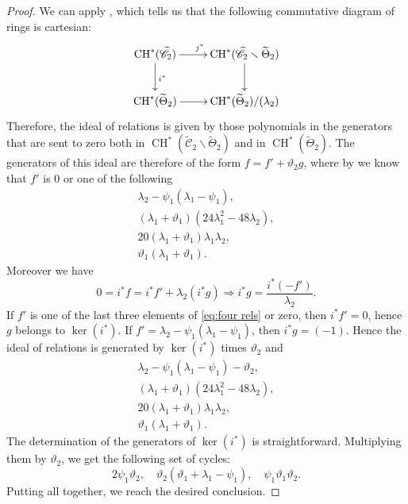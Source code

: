 \documentclass[a4paper, 10pt]{amsart}
\numberwithin{equation}{section}
\numberwithin{subsection}{section}
\theoremstyle{definition}
\theoremstyle{remark}
\renewcommand{\mathcal}{\mathscr}
\newcommand{\Ctilde}{\widetilde{\mathcal C}}
\newcommand{\ThTilde}{\widetilde{\Theta}}
\newcommand{\ch}[1][*]{\operatorname{CH}^{#1}}
\begin{document}
\begin{proof}
		We can apply , which tells us that the following commutative diagram of rings is cartesian:
		\begin{equation}
			\xymatrix{
				\ch(\Ctilde_2) \ar[r]^{j^*}\ar[d]^{i^*} & \ch(\Ctilde_2\smallsetminus\ThTilde_2) \ar[d] \\
				\ch(\ThTilde_2) \ar[r] & \ch(\ThTilde_2)/(\lambda_2)}
		\end{equation}
		Therefore, the ideal of relations is given by those polynomials in the generators that are sent to zero both in $\ch(\Ctilde_2\smallsetminus\ThTilde_2)$ and in $\ch(\ThTilde_2)$. The generators of this ideal are therefore of the form $f=f'+\vartheta_2 g$, where by  we know that $f'$ is $0$ or one of the following
		\begin{align}\label{eq:four rels}
			\lambda_2-\psi_1(\lambda_1-\psi_1),\nonumber\\
			(\lambda_1+\vartheta_1)(24\lambda_1^2-48\lambda_2), \nonumber\\
			20(\lambda_1+\vartheta_1)\lambda_1\lambda_2, \\
			\vartheta_1(\lambda_1+\vartheta_1). \nonumber
		\end{align}
		 Moreover we have
		\[ 0= i^*f = i^*f' + \lambda_2 (i^*g) \Rightarrow i^*g = \frac{i^*(-f')}{\lambda_2}. \]
		If $f'$ is one of the last three elements of \eqref{eq:four rels} or zero, then $i^*f'=0$, hence $g$ belongs to $\ker(i^*)$. If $f'=\lambda_2-\psi_1(\lambda_1-\psi_1)$, then $i^*g=(-1)$. Hence the ideal of relations is generated by $\ker(i^*)$ times $\vartheta_2$ and
		\begin{align*}
			\lambda_2-\psi_1(\lambda_1-\psi_1)-\vartheta_2,\\
			(\lambda_1+\vartheta_1)(24\lambda_1^2-48\lambda_2),\\
			20(\lambda_1+\vartheta_1)\lambda_1\lambda_2,\\
			\vartheta_1(\lambda_1+\vartheta_1).
		\end{align*}
		The determination of the generators of $\ker(i^*)$ is straightforward. Multiplying them by $\vartheta_2$, we get the following set of cycles:
		\[ 2\psi_1\vartheta_2,\quad \vartheta_2(\vartheta_1+\lambda_1-\psi_1),\quad \psi_1\vartheta_1\vartheta_2. \]
		Putting all together, we reach the desired conclusion.
	\end{proof}
	
\end{document}
